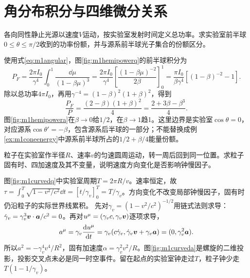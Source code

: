 \section{角分布积分与四维微分关系}
\begin{example}\label{ex:m1hemipower}
各向同性静止光源以速度$V$运动，按实验室发射时间定义总功率。求实验室前半球$0\leq\theta\leq\pi/2$收到的功率份额，并与源系前半球光子集合的份额区分。
\end{example}
\begin{solution}
使用式\eqref{eq:m1angular}，图\ref{fig:m1hemipowerq}的前半球积分为
\[
 P_F=\frac{2\pi I_0}{\gamma^4}\int_0^1\frac{\dd\mu}{(1-\beta\mu)^3}
 =\frac{2\pi I_0}{\gamma^4}
 \left[\frac{(1-\beta\mu)^{-2}}{2\beta}\right]_0^1
 =\frac{\pi I_0}{\beta\gamma^4}[(1-\beta)^{-2}-1].
\]
除以总功率$4\pi I_0$，再用$\gamma^{-4}=(1-\beta)^2(1+\beta)^2$，得到
\[
 \frac{P_F}P=\frac{(2-\beta)(1+\beta)^2}{4}
 =\frac{2+3\beta-\beta^3}{4}.
\]
图\ref{fig:m1hemipowera}在$\beta\to0$给$1/2$，在$\beta\to1$趋1。这里边界是实验室$\cos\theta=0$，对应源系$\cos\theta'=-\beta$，包含源系后半球的一部分；不能替换成例\ref{ex:m1coneenergy}中源系前半球所占的$1/2+\beta/4$能量份额。
\end{solution}

\begin{example}\label{ex:m1curvedproper}
粒子在实验室作半径$R$、速率$v$的匀速圆周运动，转一周后回到同一位置。求粒子固有时、四加速度及其不变量，说明速度方向变化是否影响钟慢因子。
\end{example}
\begin{solution}
图\ref{fig:m1curvedq}中实验室周期$T=2\pi R/v$。速率恒定，故$\tau=\int_0^T\sqrt{1-v^2/c^2}\dd t=[t/\gamma_v]_0^T=T/\gamma_v$。方向变化不改变局部钟慢因子，固有时仍沿粒子的实际世界线累积。
先对$\gamma_v=(1-v^2/c^2)^{-1/2}$用链式法则求导：$\dot\gamma_v=\gamma_v^3\bm{v}\cdot\bm{a}/c^2=0$。再对$u^\mu=(\gamma_vc,\gamma_v\bm{v})$逐项求导，
\[
 a^\mu=\gamma_v\frac{\mathop{}\!\mathrm d u^\mu}{\mathop{}\!\mathrm d t}
 =\gamma_v(c\dot\gamma_v,\dot\gamma_v\bm{v}+\gamma_v\bm{a})
 =(0,\gamma_v^2\bm{a}).
\]
所以$a^2=-\gamma_v^4v^4/R^2$，固有加速度$\alpha=\gamma_v^2v^2/R$。图\ref{fig:m1curveda}是螺旋的二维投影，投影交叉点未必是同一时空事件。留在起点的实验室钟走过$T$，粒子钟少走$T(1-1/\gamma_v)$。
\end{solution}
